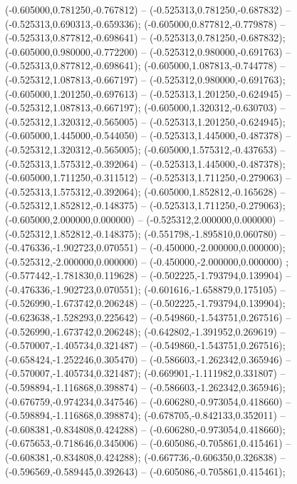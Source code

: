  (-0.605000,0.781250,-0.767812) -- (-0.525313,0.781250,-0.687832) -- (-0.525313,0.690313,-0.659336);
 (-0.605000,0.877812,-0.779878) -- (-0.525313,0.877812,-0.698641) -- (-0.525313,0.781250,-0.687832);
 (-0.605000,0.980000,-0.772200) -- (-0.525312,0.980000,-0.691763) -- (-0.525313,0.877812,-0.698641);
 (-0.605000,1.087813,-0.744778) -- (-0.525312,1.087813,-0.667197) -- (-0.525312,0.980000,-0.691763);
 (-0.605000,1.201250,-0.697613) -- (-0.525313,1.201250,-0.624945) -- (-0.525312,1.087813,-0.667197);
 (-0.605000,1.320312,-0.630703) -- (-0.525312,1.320312,-0.565005) -- (-0.525313,1.201250,-0.624945);
 (-0.605000,1.445000,-0.544050) -- (-0.525313,1.445000,-0.487378) -- (-0.525312,1.320312,-0.565005);
 (-0.605000,1.575312,-0.437653) -- (-0.525313,1.575312,-0.392064) -- (-0.525313,1.445000,-0.487378);
 (-0.605000,1.711250,-0.311512) -- (-0.525313,1.711250,-0.279063) -- (-0.525313,1.575312,-0.392064);
 (-0.605000,1.852812,-0.165628) -- (-0.525312,1.852812,-0.148375) -- (-0.525313,1.711250,-0.279063);
 (-0.605000,2.000000,0.000000) -- (-0.525312,2.000000,0.000000) -- (-0.525312,1.852812,-0.148375);
 (-0.551798,-1.895810,0.060780) -- (-0.476336,-1.902723,0.070551) -- (-0.450000,-2.000000,0.000000);
 (-0.525312,-2.000000,0.000000) -- (-0.450000,-2.000000,0.000000) ;
 (-0.577442,-1.781830,0.119628) -- (-0.502225,-1.793794,0.139904) -- (-0.476336,-1.902723,0.070551);
 (-0.601616,-1.658879,0.175105) -- (-0.526990,-1.673742,0.206248) -- (-0.502225,-1.793794,0.139904);
 (-0.623638,-1.528293,0.225642) -- (-0.549860,-1.543751,0.267516) -- (-0.526990,-1.673742,0.206248);
 (-0.642802,-1.391952,0.269619) -- (-0.570007,-1.405734,0.321487) -- (-0.549860,-1.543751,0.267516);
 (-0.658424,-1.252246,0.305470) -- (-0.586603,-1.262342,0.365946) -- (-0.570007,-1.405734,0.321487);
 (-0.669901,-1.111982,0.331807) -- (-0.598894,-1.116868,0.398874) -- (-0.586603,-1.262342,0.365946);
 (-0.676759,-0.974234,0.347546) -- (-0.606280,-0.973054,0.418660) -- (-0.598894,-1.116868,0.398874);
 (-0.678705,-0.842133,0.352011) -- (-0.608381,-0.834808,0.424288) -- (-0.606280,-0.973054,0.418660);
 (-0.675653,-0.718646,0.345006) -- (-0.605086,-0.705861,0.415461) -- (-0.608381,-0.834808,0.424288);
 (-0.667736,-0.606350,0.326838) -- (-0.596569,-0.589445,0.392643) -- (-0.605086,-0.705861,0.415461);
